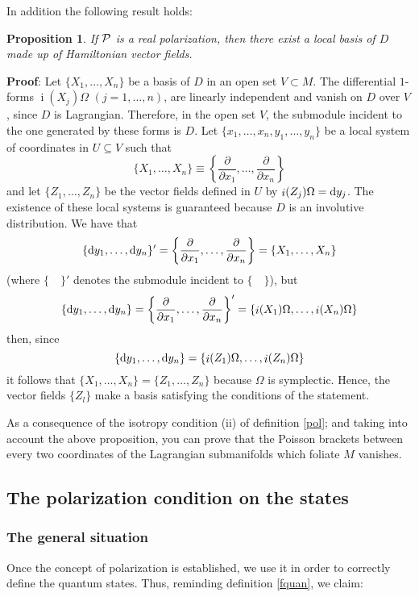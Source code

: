 \documentclass[12pt]{article}
\newtheorem{prop}{Proposition}
\def\derpar#1#2{\frac{\partial{#1}}{\partial{#2}}}
\def\qed{\ifvmode\removelastskip\fi
{\unskip\nobreak\hfil\penalty50\hbox{}\nobreak\hfil
\hbox{\vrule height1.2ex width1.2ex}\parfillskip=0pt
\finalhyphendemerits=0 \par\smallskip}}
\def\d{{\rm d}}
\def\inn{\mathop{i}\nolimits}
\begin{document}
In addition the following result holds:

\begin{prop}
If ${\cal P}$ is a real polarization,
then there exist a local basis of $D$
made up of Hamiltonian vector fields.
\label{blh}
\end{prop}
{\bf Proof}: 
Let $\{ X_1,\ldots ,X_n \}$ be a basis of $D$
in an open set $V \subset M$.
The differential $1$-forms
$\inn(X_j)\Omega$ $(j=1,\ldots ,n)$,
are linearly independent and vanish on $D$ over $V$,
since $D$ is Lagrangian.
Therefore, in the open set $V$, the submodule incident to the one
generated by these forms is $D$.
Let $\{ x_1,\ldots ,x_n,y_1,\ldots ,y_n \}$ be
a local system of coordinates in $U \subseteq V$ such that
$$
\{ X_1,\ldots ,X_n \} \equiv
\left\{ \derpar{}{x_1},\ldots ,\derpar{}{x_n} \right\}
$$
and let $\{ Z_1,\ldots ,Z_n \}$ be
the vector fields defined in $U$ by
$\inn(Z_j)\Omega =\d y_j$.
The existence of these local systems is guaranteed
because $D$ is an involutive distribution.
We have that
$$
\{ \d y_1,\ldots ,\d y_n \}' =
\left\{ \derpar{}{x_1},\ldots ,\derpar{}{x_n} \right\} =
\{ X_1,\ldots ,X_n \}
$$
(where $\{\quad \}'$ denotes the submodule incident to $\{\quad \}$),
but
$$
\{ \d y_1,\ldots ,\d y_n \} =
\left\{ \derpar{}{x_1},\ldots ,\derpar{}{x_n} \right\}' =
\{ \inn(X_1)\Omega ,\ldots ,\inn(X_n)\Omega \}
$$
then, since
$$
\{ \d y_1,\ldots ,\d y_n \} =
\{ \inn(Z_1)\Omega ,\ldots ,\inn(Z_n)\Omega \}
$$
it follows that $\{ X_1,\ldots ,X_n \} = \{ Z_1,\ldots ,Z_n \}$
because $\Omega$ is symplectic.
Hence, the vector fields $\{ Z_l \}$
make a basis satisfying the
conditions of the statement.
\qed

As a consequence of the isotropy condition (ii) of definition
\ref{pol}; and taking into account the above proposition,
you can prove that the Poisson brackets between every two coordinates
of the Lagrangian submanifolds which foliate $M$ vanishes.


\subsection{The polarization condition on the states}


\subsubsection{The general situation}


Once the concept of polarization is established,
we use it in order to correctly define the quantum states.
Thus, reminding definition \ref{fquan}, we claim:
\end{document}
